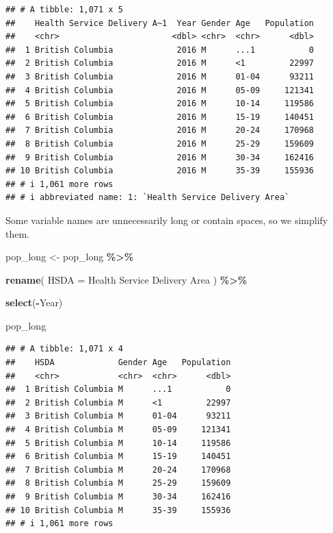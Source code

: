 \documentclass[
  11pt,
  oneside]{book}
\newenvironment{Shaded}{\begin{snugshade}}{\end{snugshade}}
\newcommand{\AttributeTok}[1]{\textcolor[rgb]{0.13,0.29,0.53}{#1}}
\newcommand{\FunctionTok}[1]{\textcolor[rgb]{0.13,0.29,0.53}{\textbf{#1}}}
\newcommand{\NormalTok}[1]{#1}
\newcommand{\OtherTok}[1]{\textcolor[rgb]{0.56,0.35,0.01}{#1}}
\newcommand{\SpecialCharTok}[1]{\textcolor[rgb]{0.81,0.36,0.00}{\textbf{#1}}}
\newcommand{\StringTok}[1]{\textcolor[rgb]{0.31,0.60,0.02}{#1}}
\begin{document}
\begin{verbatim}
## # A tibble: 1,071 x 5
##    Health Service Delivery A~1  Year Gender Age   Population
##    <chr>                       <dbl> <chr>  <chr>      <dbl>
##  1 British Columbia             2016 M      ...1           0
##  2 British Columbia             2016 M      <1         22997
##  3 British Columbia             2016 M      01-04      93211
##  4 British Columbia             2016 M      05-09     121341
##  5 British Columbia             2016 M      10-14     119586
##  6 British Columbia             2016 M      15-19     140451
##  7 British Columbia             2016 M      20-24     170968
##  8 British Columbia             2016 M      25-29     159609
##  9 British Columbia             2016 M      30-34     162416
## 10 British Columbia             2016 M      35-39     155936
## # i 1,061 more rows
## # i abbreviated name: 1: `Health Service Delivery Area`
\end{verbatim}

Some variable names are unnecessarily long or contain spaces, so we simplify them.

\begin{Shaded}
\begin{Highlighting}[]
\NormalTok{pop\_long }\OtherTok{\textless{}{-}}\NormalTok{ pop\_long }\SpecialCharTok{\%\textgreater{}\%}
  
  \FunctionTok{rename}\NormalTok{(}
    \AttributeTok{HSDA =} \StringTok{\textasciigrave{}}\AttributeTok{Health Service Delivery Area}\StringTok{\textasciigrave{}}
\NormalTok{  ) }\SpecialCharTok{\%\textgreater{}\%}
  
  \FunctionTok{select}\NormalTok{(}\SpecialCharTok{{-}}\NormalTok{Year)}

\NormalTok{pop\_long}
\end{Highlighting}
\end{Shaded}

\begin{verbatim}
## # A tibble: 1,071 x 4
##    HSDA             Gender Age   Population
##    <chr>            <chr>  <chr>      <dbl>
##  1 British Columbia M      ...1           0
##  2 British Columbia M      <1         22997
##  3 British Columbia M      01-04      93211
##  4 British Columbia M      05-09     121341
##  5 British Columbia M      10-14     119586
##  6 British Columbia M      15-19     140451
##  7 British Columbia M      20-24     170968
##  8 British Columbia M      25-29     159609
##  9 British Columbia M      30-34     162416
## 10 British Columbia M      35-39     155936
## # i 1,061 more rows
\end{verbatim}
\end{document}
